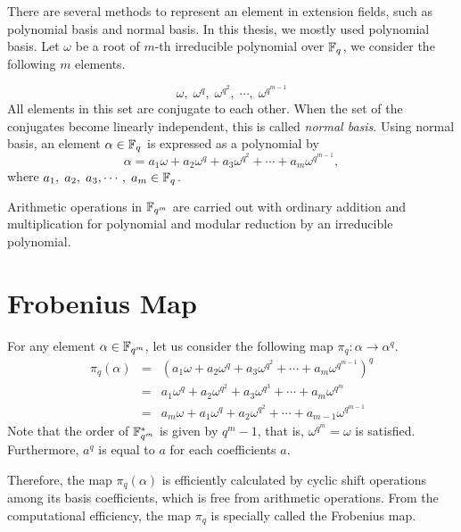 There are several methods to represent an element in extension fields, such as polynomial basis and normal basis.
In this thesis, we mostly used polynomial basis.
Let $\omega$ be a root of $m$-th irreducible polynomial over ${\mathbb{F}}_{q^{}}$, we consider the following $m$ elements.

\begin{equation}
\omega,\;\omega^q,\;\omega^{q^2},\;\cdots,\;\omega^{q^{m-1}} \nonumber
\end{equation}
All elements in this set are conjugate to each other.
When the set of the conjugates become linearly independent, this is called {\it normal basis}.
Using normal basis, an element $\alpha \in {\mathbb{F}}_{q^{}}$ is expressed as a polynomial by  
\begin{equation}
\alpha = a_1 \omega + a_2 \omega^q + a_3 \omega^{q^2} + \cdots + a_m \omega^{q^{m-1}}, 
\end{equation}
where $a_1,\;a_2,\;a_3,\cdots,\;a_m \in {\mathbb{F}}_{q^{}}$.

Arithmetic operations in ${\mathbb{F}}_{q^{m}}$ are carried out with ordinary addition and multiplication for polynomial and modular reduction by an irreducible polynomial.

\section{Frobenius Map}
\label{sec:chap:fund:frobeniusmap}

For any element $\alpha \in {\mathbb{F}}_{q^{m}}$, let us consider the following map $\pi_q:\alpha \rightarrow \alpha^q$. 
\begin{eqnarray}
\pi_q(\alpha) &=& \left( a_1 \omega + a_2 \omega^q + a_3 \omega^{q^2} + \cdots + a_m \omega^{q^{m-1}} \right)^q \nonumber \\ 
&=& a_1 \omega^q + a_2 \omega^{q^2} + a_3 \omega^{q^3} + \cdots + a_m \omega^{q^m} \nonumber \\
&=& a_m \omega + a_1 \omega^q + a_2 \omega^{q^2} + \cdots + a_{m-1} \omega^{q^{m-1}}
\end{eqnarray}
Note that the order of ${\mathbb{F}}_{q^{m}}^*$ is given by $q^m - 1$, that is,  $\omega^{q^m} = \omega$ is satisfied.
Furthermore, $a^q$ is equal to $a$ for each coefficients $a$.

Therefore, the map $\pi_q(\alpha)$ is efficiently calculated by cyclic shift operations among its basis coefficients, 
which is free from arithmetic operations.
From the computational efficiency, the map $\pi_q$ is specially called the Frobenius map.

